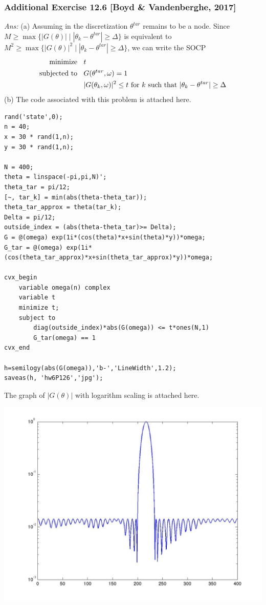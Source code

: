 \documentclass[12pt,a4paper]{article}
\begin{document}
\subsubsection*{Additional Exercise 12.6 [Boyd \& Vandenberghe, 2017]}
{\it Ans:} (a) Assuming in the discretization $\theta^{tar}$ remains to be a node. Since $M \geq \max\{|G(\theta)| \mid |\theta_k - \theta^{tar}|\geq \Delta\}$ is equivalent to $M^2 \geq \max\{|G(\theta)|^2 \mid |\theta_k - \theta^{tar}|\geq \Delta\}$, we can write the SOCP
\begin{align*}
\mbox{minimize \;\;} & t\\
\mbox{subjected to \;\;} & G(\theta^{tar},\omega) = 1\\
& |G(\theta_k, \omega)|^2 \leq t \mbox{ for } k \mbox{ such that } |\theta_k - \theta^{tar}|\geq \Delta
\end{align*}
(b) The code associated with this problem is attached here. 
\begin{verbatim}
rand('state',0);
n = 40;
x = 30 * rand(1,n);
y = 30 * rand(1,n);

N = 400;
theta = linspace(-pi,pi,N)';
theta_tar = pi/12;
[~, tar_k] = min(abs(theta-theta_tar));
theta_tar_approx = theta(tar_k);
Delta = pi/12;
outside_index = (abs(theta-theta_tar)>= Delta);
G = @(omega) exp(1i*(cos(theta)*x+sin(theta)*y))*omega;
G_tar = @(omega) exp(1i*(cos(theta_tar_approx)*x+sin(theta_tar_approx)*y))*omega;

cvx_begin
    variable omega(n) complex
    variable t
    minimize t;
    subject to
        diag(outside_index)*abs(G(omega)) <= t*ones(N,1)
        G_tar(omega) == 1
cvx_end

h=semilogy(abs(G(omega)),'b-','LineWidth',1.2);
saveas(h, 'hw6P126','jpg');
\end{verbatim}
The graph of $|G(\theta)|$ with logarithm scaling is attached here.
\begin{center}
\includegraphics[scale=0.3]{hw6P126.jpg}
\end{center}
\end{document}
